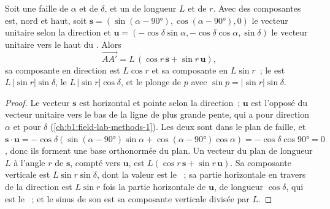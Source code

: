 \begin{proposition}\label{prop:b1:faults-folds-fabrics:slip-components}
Soit une faille de  $\alpha$ et de  $\delta$, et un  de
longueur $L$ et de  $r$. Avec des composantes est, nord et haut, soit
$\mathbf s = (\sin(\alpha-\ang{90}), \cos(\alpha-\ang{90}), 0)$ le vecteur unitaire
selon la direction et $\mathbf u = (-\cos\delta\sin\alpha,
-\cos\delta\cos\alpha, \sin\delta)$ le vecteur unitaire vers le haut du . Alors
\[
  \overrightarrow{AA'} = L\,(\cos r\,\mathbf s + \sin r\,\mathbf u),
\]
sa composante en direction est $L\cos r$ et sa composante en  $L\sin r$~;
le  est $L\,|\sin r|\sin\delta$, le  $L\,|\sin r|\cos\delta$, et
le  plonge de $p$ avec $\sin p = |\sin r|\sin\delta$.
\end{proposition}

\begin{proof}
Le vecteur $\mathbf s$ est horizontal et pointe selon la direction~; $\mathbf u$
est l'opposé du vecteur unitaire vers le bas de la ligne de plus grande pente, qui a pour direction
$\alpha$ et pour  $\delta$ (\cref{ch:b1:field-lab-methods-1}). Les deux sont dans
le plan de faille, et $\mathbf s\cdot\mathbf u = -\cos\delta(\sin(\alpha -
\ang{90})\sin\alpha + \cos(\alpha - \ang{90})\cos\alpha) = -\cos\delta\cos\ang{90} = 0$,
donc ils forment une base orthonormée du plan. Un vecteur du plan de
longueur $L$ à l'angle $r$ de $\mathbf s$, compté vers $\mathbf u$, est
$L(\cos r\,\mathbf s + \sin r\,\mathbf u)$. Sa composante verticale est
$L\sin r\sin\delta$, dont la valeur est le ~; sa partie horizontale en travers de la
direction est $L\sin r$ fois la partie horizontale de $\mathbf u$, de longueur
$\cos\delta$, qui est le ~; et le sinus de son  est sa composante
verticale divisée par $L$.
\end{proof}

